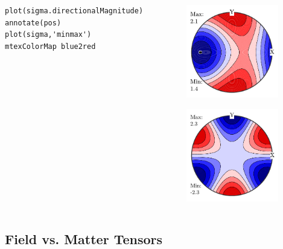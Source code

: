 \documentclass[compress]{beamer}
\begin{document}
\begin{frame}[fragile]
\begin{columns}
\begin{column}{8.3cm}
\begin{overlayarea}{\textwidth}{8cm}
\pause

  \begin{lstlisting}[style=input]
plot(sigma.directionalMagnitude)
annotate(pos)
plot(sigma,'minmax')
mtexColorMap blue2red
  \end{lstlisting}
\end{overlayarea}
\end{column}
    \begin{column}{3.7cm}
      \includegraphics[width=4cm]{pic/sigmaMin}

      \includegraphics[width=4cm]{pic/piezoComplete}
    \end{column}

  \end{columns}

\end{frame}

\subsection*{Field vs. Matter Tensors}
\end{document}
